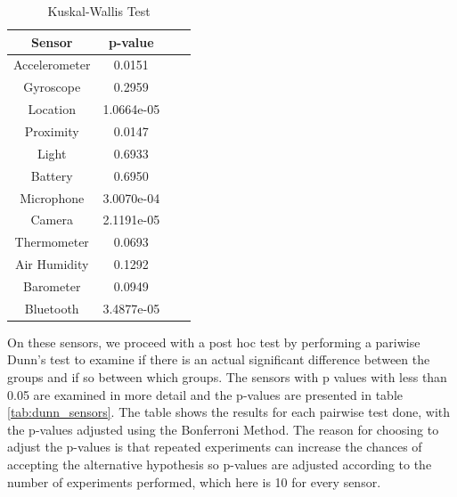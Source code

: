 \begin{table}[h!]
  \centering
  \caption{Kuskal-Wallis Test}
  \label{tab:kw_sensors}
  \begin{tabular}{cccc}
    \toprule
     Sensor & p-value \\
    \midrule
    Accelerometer & 0.0151 \\
    Gyroscope & 0.2959\\
    Location & 1.0664e-05\\
    Proximity & 0.0147\\ 
    Light & 0.6933\\
    Battery & 0.6950\\ 
    Microphone & 3.0070e-04\\
    Camera & 2.1191e-05\\
    Thermometer & 0.0693\\ 
    Air Humidity & 0.1292\\
    Barometer & 0.0949\\
    Bluetooth & 3.4877e-05\\ 
    \bottomrule
  \end{tabular}
\end{table} 



On these sensors, we proceed with a post hoc test by performing a pariwise Dunn's test to examine if there is an actual significant difference between the groups and if so between which groups. The sensors with p values with less than 0.05 are examined in more detail and the p-values are presented in table \ref{tab:dunn_sensors}. The table shows the results for each pairwise test done, with the p-values adjusted using the Bonferroni Method. The reason for choosing to adjust the p-values is that repeated experiments can increase the chances of accepting the alternative hypothesis so p-values are adjusted according to the number of experiments performed, which here is 10 for every sensor.

